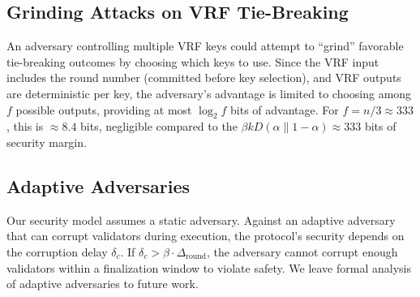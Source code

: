 \subsection{Grinding Attacks on VRF Tie-Breaking}

An adversary controlling multiple VRF keys could attempt to ``grind'' favorable tie-breaking
outcomes by choosing which keys to use. Since the VRF input includes the round number
(committed before key selection), and VRF outputs are deterministic per key, the adversary's
advantage is limited to choosing among $f$ possible outputs, providing at most $\log_2 f$
bits of advantage. For $f = n/3 \approx 333$, this is $\approx 8.4$ bits, negligible compared
to the $\beta k D(\alpha \| 1-\alpha) \approx 333$ bits of security margin.

\subsection{Adaptive Adversaries}

Our security model assumes a static adversary. Against an adaptive adversary that can corrupt
validators during execution, the protocol's security depends on the corruption delay $\delta_c$.
If $\delta_c > \beta \cdot \Delta_{\text{round}}$, the adversary cannot corrupt enough
validators within a finalization window to violate safety. We leave formal analysis of
adaptive adversaries to future work.


